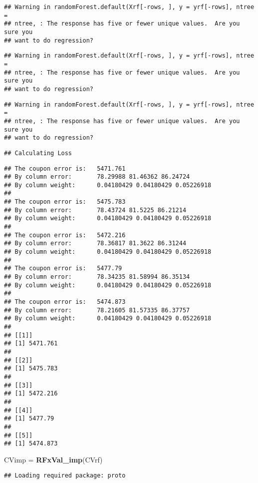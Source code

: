 \documentclass[10pt]{report}
\newenvironment{Shaded}{}{}
\newcommand{\KeywordTok}[1]{\textcolor[rgb]{0.00,0.44,0.13}{\textbf{{#1}}}}
\newcommand{\StringTok}[1]{\textcolor[rgb]{0.25,0.44,0.63}{{#1}}}
\newcommand{\NormalTok}[1]{{#1}}
\begin{document}
\begin{verbatim}
## Warning in randomForest.default(Xrf[-rows, ], y = yrf[-rows], ntree =
## ntree, : The response has five or fewer unique values.  Are you sure you
## want to do regression?
\end{verbatim}

\begin{verbatim}
## Warning in randomForest.default(Xrf[-rows, ], y = yrf[-rows], ntree =
## ntree, : The response has five or fewer unique values.  Are you sure you
## want to do regression?
\end{verbatim}

\begin{verbatim}
## Warning in randomForest.default(Xrf[-rows, ], y = yrf[-rows], ntree =
## ntree, : The response has five or fewer unique values.  Are you sure you
## want to do regression?
\end{verbatim}

\begin{verbatim}
## Calculating Loss
\end{verbatim}

\begin{verbatim}
## The coupon error is:   5471.761 
## By column error:       78.29988 81.46362 86.24724 
## By column weight:      0.04180429 0.04180429 0.05226918 
## 
## The coupon error is:   5475.783 
## By column error:       78.43724 81.5225 86.21214 
## By column weight:      0.04180429 0.04180429 0.05226918 
## 
## The coupon error is:   5472.216 
## By column error:       78.36817 81.3622 86.31244 
## By column weight:      0.04180429 0.04180429 0.05226918 
## 
## The coupon error is:   5477.79 
## By column error:       78.34235 81.58994 86.35134 
## By column weight:      0.04180429 0.04180429 0.05226918 
## 
## The coupon error is:   5474.873 
## By column error:       78.21605 81.57335 86.37757 
## By column weight:      0.04180429 0.04180429 0.05226918 
## 
## [[1]]
## [1] 5471.761
## 
## [[2]]
## [1] 5475.783
## 
## [[3]]
## [1] 5472.216
## 
## [[4]]
## [1] 5477.79
## 
## [[5]]
## [1] 5474.873
\end{verbatim}

\begin{Shaded}
\begin{Highlighting}[]
\NormalTok{CVimp =}\StringTok{ }\KeywordTok{RFxVal_imp}\NormalTok{(CVrf)}
\end{Highlighting}
\end{Shaded}

\begin{verbatim}
## Loading required package: proto
\end{verbatim}
\end{document}
